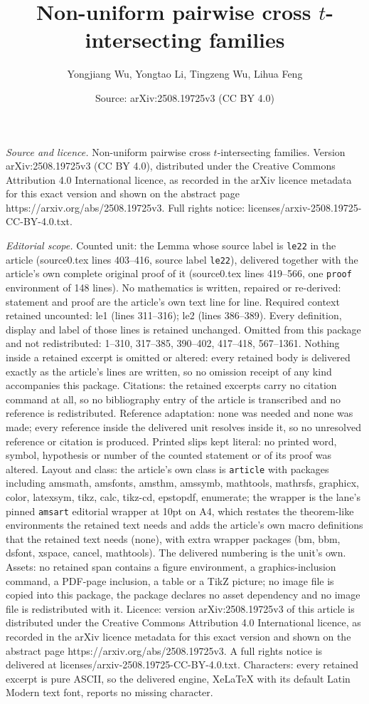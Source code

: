 \documentclass[10pt,a4paper]{amsart}
\title[Non-uniform pairwise cross $t$-intersecting families]{Non-uniform pairwise cross $t$-intersecting families}
\author{Yongjiang Wu, Yongtao Li, Tingzeng Wu, Lihua Feng}
\date{Source: arXiv:2508.19725v3 (CC BY 4.0)}
\begin{document}
\maketitle

\noindent\emph{Source and licence.} Non-uniform pairwise cross $t$-intersecting families. Version arXiv:2508.19725v3 (CC BY 4.0), distributed under the Creative Commons Attribution 4.0 International licence, as recorded in the arXiv licence metadata for this exact version and shown on the abstract page https://arxiv.org/abs/2508.19725v3. Full rights notice: licenses/arxiv-2508.19725-CC-BY-4.0.txt.\par\smallskip

\noindent\textit{Editorial scope.} Counted unit: the Lemma whose source label is \texttt{le22} in the article (source0.tex lines 403--416, source label \texttt{le22}), delivered together with the article's own complete original proof of it (source0.tex lines 419--566, one \texttt{proof} environment of 148 lines). No mathematics is written, repaired or re-derived: statement and proof are the article's own text line for line. Required context retained uncounted: le1 (lines 311--316); le2 (lines 386--389). Every definition, display and label of those lines is retained unchanged. Omitted from this package and not redistributed: 1--310, 317--385, 390--402, 417--418, 567--1361. Nothing inside a retained excerpt is omitted or altered: every retained body is delivered exactly as the article's lines are written, so no omission receipt of any kind accompanies this package. Citations: the retained excerpts carry no citation command at all, so no bibliography entry of the article is transcribed and no reference is redistributed. Reference adaptation: none was needed and none was made; every reference inside the delivered unit resolves inside it, so no unresolved reference or citation is produced. Printed slips kept literal: no printed word, symbol, hypothesis or number of the counted statement or of its proof was altered. Layout and class: the article's own class is \texttt{article} with packages including amsmath, amsfonts, amsthm, amssymb, mathtools, mathrsfs, graphicx, color, latexsym, tikz, calc, tikz-cd, epstopdf, enumerate; the wrapper is the lane's pinned \texttt{amsart} editorial wrapper at 10pt on A4, which restates the theorem-like environments the retained text needs and adds the article's own macro definitions that the retained text needs (none), with extra wrapper packages (bm, bbm, dsfont, xspace, cancel, mathtools). The delivered numbering is the unit's own. Assets: no retained span contains a figure environment, a graphics-inclusion command, a PDF-page inclusion, a table or a TikZ picture; no image file is copied into this package, the package declares no asset dependency and no image file is redistributed with it. Licence: version arXiv:2508.19725v3 of this article is distributed under the Creative Commons Attribution 4.0 International licence, as recorded in the arXiv licence metadata for this exact version and shown on the abstract page https://arxiv.org/abs/2508.19725v3. A full rights notice is delivered at licenses/arxiv-2508.19725-CC-BY-4.0.txt. Characters: every retained excerpt is pure ASCII, so the delivered engine, XeLaTeX with its default Latin Modern text font, reports no missing character.
\end{document}

